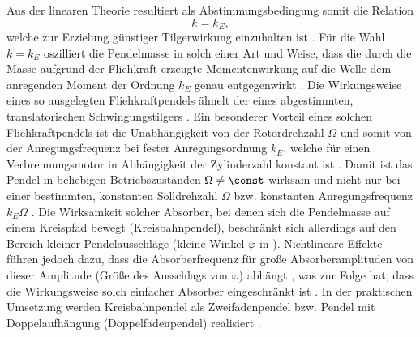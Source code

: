 Aus der linearen Theorie resultiert  als Abstimmungsbedingung somit die Relation
%
% 
%
\begin{equation}
	k = k_E,
\label{eq:Einleitung:LineareAbstimmungFliehkraftpendel}
\end{equation}
welche zur Erzielung günstiger Tilgerwirkung einzuhalten ist 
\cite{Schick:1939:WirkungFliehkraftpendel,  Slibar-Desoyer:1954:ZurErzielungOptimaler}.
Für die Wahl $k=k_E$ oszilliert die Pendelmasse in solch einer Art und Weise, 
dass die durch die Masse aufgrund der Fliehkraft erzeugte Momentenwirkung auf die Welle
dem anregenden Moment der Ordnung $k_E$ genau entgegenwirkt
\cite{Desoyer-Slibar:1953:BerechnungVonPendelTilgern,  Paslay:Slibar:1956:OptAusSalomonTilger, 
Schick:1939:WirkungFliehkraftpendel, Slibar-Desoyer:1954:ZurErzielungOptimaler}.
Die Wirkungsweise eines so ausgelegten Fliehkraftpendels ähnelt der eines abgestimmten, translatorischen
Schwingungstilgers  \cite{Vidmar:Feeney:2012:CoulombFriction}. 
Ein besonderer Vorteil eines solchen Fliehkraftpendels ist 
die Unabhängigkeit von der Rotordrehzahl $\Omega$ und somit von der Anregungsfrequenz
bei fester Anregungsordnung $k_E$, welche für einen Verbrennungsmotor in Abhängigkeit der Zylinderzahl konstant ist 
\cite{Schick:1939:WirkungFliehkraftpendel}. 
Damit ist das Pendel in beliebigen Betriebszuständen $\Omega \neq \const$ wirksam und
nicht nur bei einer bestimmten, konstanten Solldrehzahl  $\Omega$
bzw. konstanten Anregungsfrequenz $k_E \Omega$ \cite{Schick:1939:WirkungFliehkraftpendel}. 
%
%
%
Die Wirksamkeit solcher Absorber, bei denen sich die Pendelmasse auf einem Kreispfad bewegt (Kreisbahnpendel),
beschränkt sich allerdings auf den Bereich kleiner Pendelausschläge 
(kleine Winkel $\varphi$ in ).
Nichtlineare Effekte führen jedoch dazu, dass die Absorberfrequenz für große Absorberamplituden von
dieser Amplitude (Größe des Ausschlags von $\varphi$) abhängt \cite{LeeShaw:OnTheCounteraction}, was zur Folge
hat, dass die Wirkungsweise solch einfacher Absorber eingeschränkt ist \cite{ALSUWAIYAN:2002:PerformanceAnd}.
In der praktischen Umsetzung werden Kreisbahnpendel als Zweifadenpendel bzw. Pendel 
mit Doppelaufhängung (Doppelfadenpendel) realisiert \cite{Markert:2010:Fahrzeugschwingung}.



